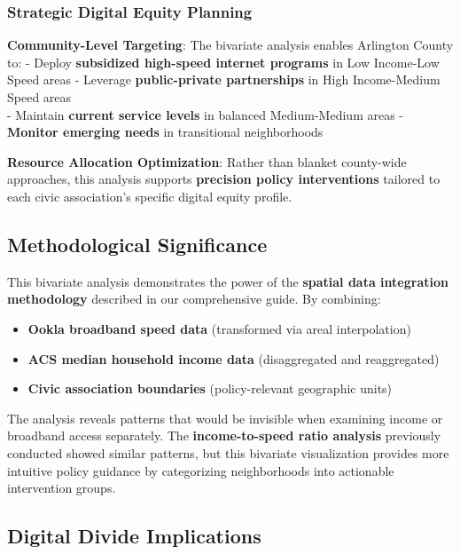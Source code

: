 \documentclass[
  letterpaper,
  DIV=11,
  numbers=noendperiod]{scrartcl}
\providecommand{\tightlist}{%
  \setlength{\itemsep}{0pt}\setlength{\parskip}{0pt}}
\begin{document}
\subsubsection{\texorpdfstring{\textbf{Strategic Digital Equity
Planning}}{Strategic Digital Equity Planning}}\label{strategic-digital-equity-planning}

\textbf{Community-Level Targeting}: The bivariate analysis enables
Arlington County to: - Deploy \textbf{subsidized high-speed internet
programs} in Low Income-Low Speed areas - Leverage
\textbf{public-private partnerships} in High Income-Medium Speed areas\\
- Maintain \textbf{current service levels} in balanced Medium-Medium
areas - \textbf{Monitor emerging needs} in transitional neighborhoods

\textbf{Resource Allocation Optimization}: Rather than blanket
county-wide approaches, this analysis supports \textbf{precision policy
interventions} tailored to each civic association's specific digital
equity profile.

\subsection{Methodological
Significance}\label{methodological-significance-1}

This bivariate analysis demonstrates the power of the \textbf{spatial
data integration methodology} described in our comprehensive guide. By
combining:

\begin{itemize}
\tightlist
\item
  \textbf{Ookla broadband speed data} (transformed via areal
  interpolation)
\item
  \textbf{ACS median household income data} (disaggregated and
  reaggregated)\\
\item
  \textbf{Civic association boundaries} (policy-relevant geographic
  units)
\end{itemize}

The analysis reveals patterns that would be invisible when examining
income or broadband access separately. The \textbf{income-to-speed ratio
analysis} previously conducted showed similar patterns, but this
bivariate visualization provides more intuitive policy guidance by
categorizing neighborhoods into actionable intervention groups.

\subsection{Digital Divide
Implications}\label{digital-divide-implications}
\end{document}
